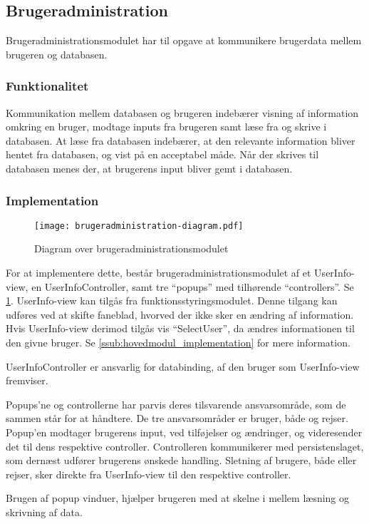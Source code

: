 \subsection{Brugeradministration}
\label{sub:Brugeradministration}

Brugeradministrationsmodulet har til opgave at kommunikere brugerdata mellem brugeren og databasen.

\subsubsection{Funktionalitet}
\label{ssub:Brugeradministration_funktionalitet}

Kommunikation mellem databasen og brugeren indebærer visning af information omkring en bruger, modtage inputs fra brugeren samt læse fra og skrive i databasen. At læse fra databasen indebærer, at den relevante information bliver hentet fra databasen, og vist på en acceptabel måde. Når der skrives til databasen menes der, at brugerens input bliver gemt i databasen.

\subsubsection{Implementation}
\label{ssub:Brugeradministration_implementation}

\begin{figure}
  \centering
  \texttt{[image: brugeradministration-diagram.pdf]}
  \caption{Diagram over brugeradministrationsmodulet} \label{fig:brugermod}
\end{figure}

For at implementere dette, består brugeradministrationsmodulet af et UserInfo-view, en UserInfoController, samt tre \enquote{popups} med tilhørende \enquote{controllers}. Se \cref{fig:brugermod}. UserInfo-view kan tilgås fra funktionsstyringsmodulet. Denne tilgang kan udføres ved at skifte faneblad, hvorved der ikke sker en ændring af information. Hvis UserInfo-view derimod tilgås vis \enquote{SelectUser}, da ændres informationen til den givne bruger. Se \cref{ssub:hovedmodul_implementation} for mere information.

UserInfoController er ansvarlig for databinding, af den bruger som UserInfo-view fremviser.

Popups'ne og controllerne har parvis deres tilsvarende ansvarsområde, som de sammen står for at håndtere. De tre ansvarsområder er bruger, både og rejser. Popup'en modtager brugerens input, ved tilføjelser og ændringer, og videresender det til dens respektive controller. Controlleren kommunikerer med persistenslaget, som dernæst udfører brugerens ønskede handling. Sletning af brugere, både eller rejser, sker direkte fra UserInfo-view til den respektive controller.

Brugen af popup vinduer, hjælper brugeren med at skelne i mellem læsning og skrivning af data.
